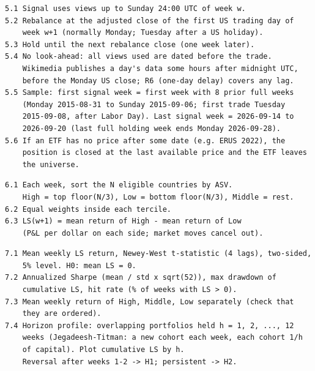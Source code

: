 \begin{Verbatim}[fontsize=\footnotesize, frame=single, framerule=0.3pt, rulecolor=\color{black!35}, framesep=2.5mm, samepage=true, label={\textcolor{black}{\textbf{5. TIMING}}}]
5.1 Signal uses views up to Sunday 24:00 UTC of week w.
5.2 Rebalance at the adjusted close of the first US trading day of
    week w+1 (normally Monday; Tuesday after a US holiday).
5.3 Hold until the next rebalance close (one week later).
5.4 No look-ahead: all views used are dated before the trade.
    Wikimedia publishes a day's data some hours after midnight UTC,
    before the Monday US close; R6 (one-day delay) covers any lag.
5.5 Sample: first signal week = first week with 8 prior full weeks
    (Monday 2015-08-31 to Sunday 2015-09-06; first trade Tuesday
    2015-09-08, after Labor Day). Last signal week = 2026-09-14 to
    2026-09-20 (last full holding week ends Monday 2026-09-28).
5.6 If an ETF has no price after some date (e.g. ERUS 2022), the
    position is closed at the last available price and the ETF leaves
    the universe.
\end{Verbatim}

\begin{Verbatim}[fontsize=\footnotesize, frame=single, framerule=0.3pt, rulecolor=\color{black!35}, framesep=2.5mm, samepage=true, label={\textcolor{black}{\textbf{6. PORTFOLIOS}}}]
6.1 Each week, sort the N eligible countries by ASV.
    High = top floor(N/3), Low = bottom floor(N/3), Middle = rest.
6.2 Equal weights inside each tercile.
6.3 LS(w+1) = mean return of High - mean return of Low
    (P&L per dollar on each side; market moves cancel out).
\end{Verbatim}

\begin{Verbatim}[fontsize=\footnotesize, frame=single, framerule=0.3pt, rulecolor=\color{black!35}, framesep=2.5mm, samepage=true, label={\textcolor{black}{\textbf{7. MAIN TESTS}}}]
7.1 Mean weekly LS return, Newey-West t-statistic (4 lags), two-sided,
    5% level. H0: mean LS = 0.
7.2 Annualized Sharpe (mean / std x sqrt(52)), max drawdown of
    cumulative LS, hit rate (% of weeks with LS > 0).
7.3 Mean weekly return of High, Middle, Low separately (check that
    they are ordered).
7.4 Horizon profile: overlapping portfolios held h = 1, 2, ..., 12
    weeks (Jegadeesh-Titman: a new cohort each week, each cohort 1/h
    of capital). Plot cumulative LS by h.
    Reversal after weeks 1-2 -> H1; persistent -> H2.
\end{Verbatim}

